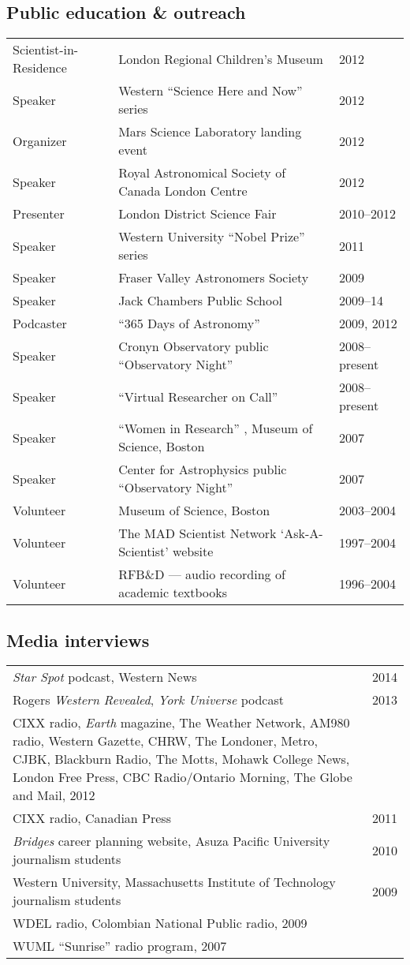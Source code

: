 \documentclass[12pt]{article}
\begin{document}
\subsection{Public education \& outreach}
\begin{tabular}{lp{11cm}l}
Scientist-in-Residence& London Regional Children's Museum& 2012\\
Speaker& Western ``Science Here and Now'' series& 2012\\
Organizer& Mars Science Laboratory landing event& 2012\\
Speaker& Royal Astronomical Society of Canada London Centre& 2012\\
Presenter& London District Science Fair& 2010--2012\\
Speaker& Western University ``Nobel Prize'' series& 2011\\
Speaker& Fraser Valley Astronomers Society& 2009\\
Speaker& Jack Chambers Public School& 2009--14\\
Podcaster &  ``365 Days of Astronomy''  &2009, 2012\\
Speaker& Cronyn Observatory public ``Observatory Night'' & 2008--present\\
Speaker& ``Virtual Researcher on Call'' & 2008--present\\
Speaker & ``Women in Research'' , Museum of Science, Boston& 2007\\
Speaker& Center for Astrophysics public ``Observatory Night'' & 2007\\
Volunteer& Museum of Science, Boston& 2003--2004\\
Volunteer& The MAD Scientist Network `Ask-A-Scientist' website& 1997--2004\\
Volunteer& RFB\&D --- audio recording of academic textbooks& 1996--2004\\
\end{tabular}

\subsection{Media interviews}
\begin{tabular}{p{15cm}l}
{\em Star Spot} podcast, Western News & 2014\\
Rogers {\em Western Revealed}, {\em York Universe} podcast & 2013\\
CIXX radio, {\em Earth} magazine, The Weather Network, AM980 radio, Western Gazette, CHRW, The Londoner, Metro, CJBK, Blackburn Radio, The Motts, Mohawk College News, London Free Press, CBC Radio/Ontario Morning, The Globe and Mail, 2012\\
CIXX radio, Canadian Press&  2011\\
{\em Bridges} career planning website, Asuza Pacific University journalism students& 2010\\
Western University, Massachusetts Institute of Technology journalism students& 2009\\
WDEL radio, Colombian National Public radio, 2009\\ 
WUML ``Sunrise'' radio program, 2007\\ 
\end{tabular}
\end{document}
